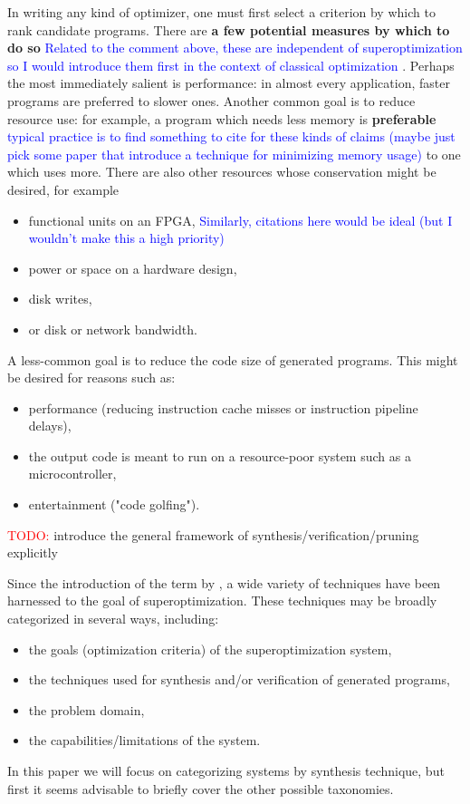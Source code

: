 \documentclass[12pt,twoside]{reedthesis}
\newcommand{\red}[1]{\textcolor{red}{#1}}
\newcommand{\comment}[2]{\textbf{#1} \textcolor{blue}{#2}}
\newcommand{\addressed}[2]{{#1}}
\begin{document}
In writing any kind of optimizer, one must first select a criterion by which to rank candidate programs.
There are
    \comment{a few potential measures by which to do so}{Related to the comment above, these are independent of superoptimization so I would introduce them first in the context of classical optimization}
    .
Perhaps the most immediately salient is performance: 
    in almost every application, faster programs are preferred to slower ones.
Another common goal is to reduce resource use: 
    for example, a program which needs less memory is
        \comment{preferable}{typical practice is to find something to cite for these kinds of claims (maybe just pick some paper that introduce a technique for minimizing memory usage)}
        to one which uses more.
There are also other resources whose conservation might be desired, for example 
\begin{itemize}
    \item functional units on an FPGA, \comment{}{Similarly, citations here would be ideal (but I wouldn't make this a high priority)}
    \item power or space on a hardware design, 
    \item disk writes, 
    \item or disk or network bandwidth.
\end{itemize}
A less-common goal is to reduce the code size of generated programs.
This might be desired for reasons such as:
\begin{itemize}
        \item performance (reducing instruction cache misses or instruction pipeline delays), 
        \item the output code is meant to run on a resource-poor system such as a microcontroller, 
        \item entertainment ("code golfing").
\end{itemize}

\red{TODO:} introduce the general framework of synthesis/verification/pruning explicitly

Since the introduction of the term by \cite{massalin1987superoptimizer}, a wide variety of techniques have been harnessed to the goal of superoptimization.
These techniques may be broadly categorized in several ways, including:
    \begin{itemize}
        \item the goals (optimization criteria) of the superoptimization system,
        \item the techniques used for synthesis and/or verification of generated programs,
        \item the problem domain,
        \item the capabilities/limitations of the system.
    \end{itemize}
In this paper we will focus on categorizing systems by synthesis technique, but first it seems advisable to briefly cover the other possible taxonomies.
\end{document}
